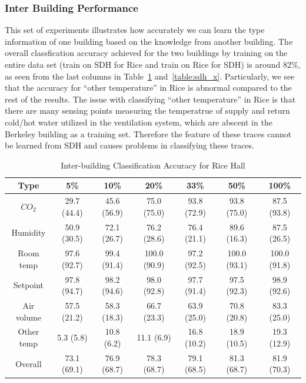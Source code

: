 \subsubsection{Inter Building Performance}
This set of experiments illustrates how accurately we can learn the type information of one building based on the knowledge from another building. The overall classfication accuracy 
achieved for the two buildings by training on the entire data set (train on SDH for Rice and train on Rice for SDH) is around 82\%, as seen from the last columns in Table~\ref{table:rice_x} 
and~\ref{table:sdh_x}. Particularly, we see that the accuracy for ``other temperature'' in Rice is abnormal compared to the rest of the
results. The issue with classifying ``other temperature'' in Rice is that there are many sensing points measuring the temperatrue of supply and return cold/hot water utilized in the 
ventilation system, which are abscent in the Berkeley building as a training set. Therefore the feature of these traces cannot be learned from SDH and causes problems in classifying these traces.

\begin{table}[ht!]
\centering %
\begin{tabular}{c | c | c | c | c | c | c}%
\hline %
Type & 5\% & 10\% & 20\% & 33\% & 50\% & 100\% \\ %
\hline\hline %
$CO_{2}$ & 29.7 (44.4) & 45.6 (56.9) & 75.0 (75.0) & 93.8 (72.9) & 93.8 (75.0) & 87.5 (93.8)\\ \hline
Humidity & 50.9 (30.5) & 72.1 (26.7) & 76.2 (28.6) & 76.4 (21.1) & 89.6 (16.3) & 87.5 (26.5)\\ \hline
Room temp & 97.6 (92.7) & 99.4 (91.4) & 100.0 (90.9) & 97.2 (92.5) & 100.0 (93.1) & 100.0 (91.8)\\ \hline
Setpoint & 97.8 (94.7) & 98.2 (94.6) & 98.0 (92.8) & 97.7 (91.4) & 97.5 (92.3) & 98.9 (92.6)\\ \hline
Air volume & 57.5 (21.2) & 58.3 (18.3) & 66.7 (23.3) & 63.9 (25.0) & 70.8 (20.8) & 83.3 (25.0)\\ \hline
Other temp & 5.3 (5.8) & 10.8 (6.2) & 11.1 (6.9) & 16.8 (10.2) & 18.9 (10.5) & 19.3 (12.9)\\ \hline
Overall & 73.1 (69.1) & 76.9 (68.7) & 78.3 (68.7) & 79.1 (68.5) & 81.3 (68.7) & 81.9 (70.3)\\ \hline
\end{tabular}
\caption{Inter-building Classification Accuracy for Rice Hall}
\label{table:rice_x} %
\end{table}

